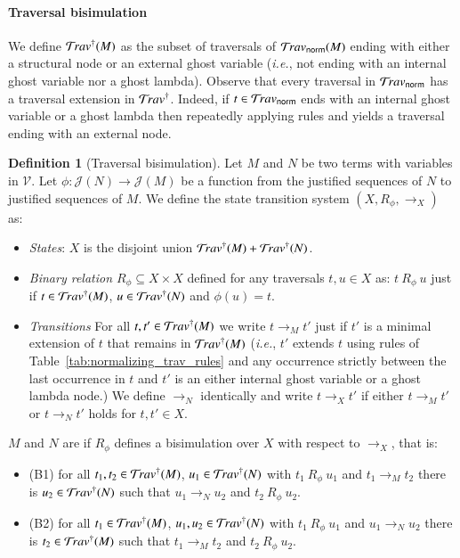 \documentclass{elsarticle}
\makeatletter
\theoremstyle{plain}
\theoremstyle{definition}
\newtheorem{definition}{Definition}[section]
\theoremstyle{remark}
\newcommand{\normalizing}{{\sf norm}}
\newcommand{\travsetnorm}{\travset_\normalizing}
\renewcommand\ie{{\it i.e.\@\xspace}}
\def\justseqset{\mathcal{J}}
\makeatother
\begin{document}
\paragraph{Traversal bisimulation}

We define $\mathcal{T}\!rav^\dagger(M)$ as the subset of traversals of $\travsetnorm(M)$ ending with either a structural node or an external ghost variable (\ie, not ending with an internal ghost variable nor a ghost lambda).
Observe that every traversal in $\travsetnorm$ has a traversal extension in $\mathcal{T}\!rav^\dagger$.
Indeed, if $t \in \travsetnorm$ ends with an internal ghost variable or a ghost lambda then repeatedly applying
rules  and  yields a traversal ending with an external node.

\begin{definition}[Traversal bisimulation]
\label{def:bisimilar_terms}
Let $M$ and $N$ be two terms with variables in $\mathcal{V}$. Let $\phi\colon \justseqset(N) \rightarrow\justseqset(M)$ be a function from the justified sequences of $N$ to justified sequences of $M$. We define the state transition system $(X, R_\phi, \rightarrow_X)$ as:
\begin{itemize}[nosep]
    \item \emph{States}: $X$ is the disjoint union $\mathcal{T}\!rav^\dagger(M) + \mathcal{T}\!rav^\dagger(N)$.

    \item \emph{Binary relation $R_\phi\subseteq X \times X$} defined for any traversals $t, u \in X$ as:
    $ t~R_\phi~u$ just if $t\in\mathcal{T}\!rav^\dagger(M)$, $u\in\mathcal{T}\!rav^\dagger(N)$ and $\phi(u) = t$.

    \item \emph{Transitions} For all $t, t' \in \mathcal{T}\!rav^\dagger(M)$ we write $t \rightarrow_M t'$ just if $t'$ is a minimal extension of $t$ that remains in $\mathcal{T}\!rav^\dagger(M)$ (\ie, $t'$ extends $t$ using rules of Table~\ref{tab:normalizing_trav_rules} and any occurrence strictly between the last occurrence in $t$ and $t'$ is an either internal ghost variable or a ghost lambda node.) We define $\rightarrow_N$  identically and write $t \rightarrow_X t'$ if either $t \rightarrow_M t'$ or $t \rightarrow_N t'$ holds for $t, t' \in X$.
\end{itemize}

$M$ and $N$ are  if $R_\phi$ defines a bisimulation over $X$ with respect to $\rightarrow_X$, that is:
\begin{itemize}[nosep]
    \item (B1) for all $t_1, t_2 \in \mathcal{T}\!rav^\dagger(M)$, $u_1 \in \mathcal{T}\!rav^\dagger(N)$ with $t_1~R_\phi~u_1$ and $t_1 \rightarrow_M t_2$ there is $u_2 \in \mathcal{T}\!rav^\dagger(N)$ such that $u_1 \rightarrow_N u_2$ and $t_2~R_\phi~u_2$.
    \item (B2) for all $t_1 \in \mathcal{T}\!rav^\dagger(M)$, $u_1, u_2 \in \mathcal{T}\!rav^\dagger(N)$ with $t_1~R_\phi~u_1$ and $u_1 \rightarrow_N u_2$ there is $t_2 \in \mathcal{T}\!rav^\dagger(M)$ such that $t_1 \rightarrow_M t_2$ and $t_2~R_\phi~u_2$.
\end{itemize}
\end{definition}
\end{document}
